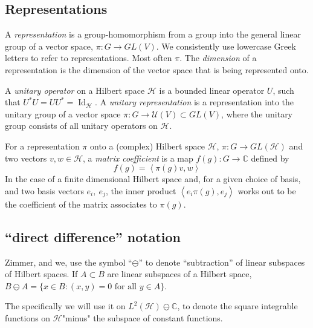 \documentclass[
  12pt
]{article}
\theoremstyle{break}
\theoremstyle{plain}
\newcommand{\bbc}{\ensuremath{\mathbb{C}}\xspace}
\newcommand{\hilb}{\ensuremath{\mathscr{H}}\xspace}
\newcommand{\inn}[1]{\left\langle #1 \right\rangle}
\DeclareMathOperator{\Id}{Id}
\begin{document}
  \hypertarget{representations}{%
  \subsection{Representations}\label{representations}}


  A \emph{representation} is a group-homomorphism from a group into the general linear
  group of a vector space, $\pi: G \rightarrow GL(V)$.
  We consistently use lowercase Greek letters to refer to representations.
  Most often $\pi$.
  The \emph{dimension} of a representation is the dimension of the vector space
  that is being represented onto.


  A \emph{unitary operator} on a Hilbert space \hilb is a bounded linear
  operator $U$, such that $U^*U= UU^* = \Id_{\hilb}$. A \emph{unitary
  representation} is a representation into the unitary group of a vector space
  $\pi: G \rightarrow \mathcal{U}(V) \subset GL(V)$, where the unitary group
  consists of all unitary operators on \hilb.

  For a representation $\pi$ onto a (complex) Hilbert space \hilb, $\pi:G \rightarrow GL(\hilb)$
  and two vectors $v, w \in \hilb$,
  a \emph{matrix coefficient} is a map $f(g): G \rightarrow \bbc$ defined by
  $$
  f(g) = \inn{\pi(g)v, w}
  $$
  In the case of a finite dimensional Hilbert space and, for a given choice of basis, and two basis vectors $e_i,\ e_j$,
  the inner product $\inn{e_i\pi(g), e_j}$ works out to be the coefficient of the matrix associates to $\pi(g)$.






  \hypertarget{direct-difference-notation}{%
  \subsection{``direct difference''
  notation}\label{direct-difference-notation}}

  Zimmer, and we, use the symbol ``$\ominus$'' to denote ``subtraction''
  of linear subspaces of Hilbert spaces. If $A \subset B$ are linear
  subspaces of a Hilbert space,
  $B \ominus A = \{x \in B: (x,y) = 0 \text{ for all }y \in A\}$.

  The specifically we will use it on $L^2(\hilb) \ominus \bbc$, to denote
  the square integrable functions on \hilb "minus" the subspace of constant functions.
\end{document}
